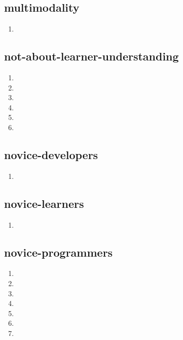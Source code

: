 \documentclass{article}
\begin{document}
\subsection{multimodality}
\begin{enumerate}
\item {}
\end{enumerate}

\subsection{not-about-learner-understanding}
\begin{enumerate}
\item {}
\item {}
\item {}
\item {}
\item {}
\item {}
\end{enumerate}

\subsection{novice-developers}
\begin{enumerate}
\item {}
\end{enumerate}

\subsection{novice-learners}
\begin{enumerate}
\item {}
\end{enumerate}

\subsection{novice-programmers}
\begin{enumerate}
\item {}
\item {}
\item {}
\item {}
\item {}
\item {}
\item {}
\end{enumerate}
\end{document}
